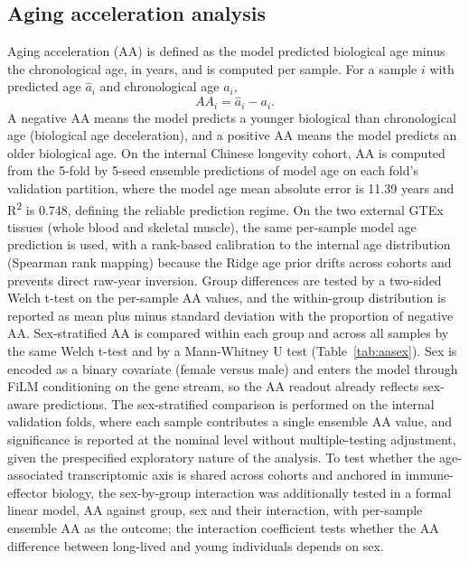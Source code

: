 \documentclass[11pt,a4paper]{article}
\begin{document}
\subsection{Aging acceleration analysis}\label{sec:aa-method}
Aging acceleration (AA) is defined as the model predicted biological age minus the chronological age, in years, and is computed per sample. For a sample $i$ with predicted age $\hat{a}_i$ and chronological age $a_i$,
\begin{equation}
AA_i = \hat{a}_i - a_i.
\label{eq:aa}
\end{equation} A negative AA means the model predicts a younger biological than chronological age (biological age deceleration), and a positive AA means the model predicts an older biological age. On the internal Chinese longevity cohort, AA is computed from the 5-fold by 5-seed ensemble predictions of model age on each fold's validation partition, where the model age mean absolute error is 11.39 years and R\textsuperscript{2} is 0.748, defining the reliable prediction regime. On the two external GTEx tissues (whole blood and skeletal muscle), the same per-sample model age prediction is used, with a rank-based calibration to the internal age distribution (Spearman rank mapping) because the Ridge age prior drifts across cohorts and prevents direct raw-year inversion. Group differences are tested by a two-sided Welch t-test on the per-sample AA values, and the within-group distribution is reported as mean plus minus standard deviation with the proportion of negative AA. Sex-stratified AA is compared within each group and across all samples by the same Welch t-test and by a Mann-Whitney U test (Table~\ref{tab:aasex}). Sex is encoded as a binary covariate (female versus male) and enters the model through FiLM conditioning on the gene stream, so the AA readout already reflects sex-aware predictions. The sex-stratified comparison is performed on the internal validation folds, where each sample contributes a single ensemble AA value, and significance is reported at the nominal level without multiple-testing adjustment, given the prespecified exploratory nature of the analysis. To test whether the age-associated transcriptomic axis is shared across cohorts and anchored in immune-effector biology, the sex-by-group interaction was additionally tested in a formal linear model, AA against group, sex and their interaction, with per-sample ensemble AA as the outcome; the interaction coefficient tests whether the AA difference between long-lived and young individuals depends on sex.
\end{document}
